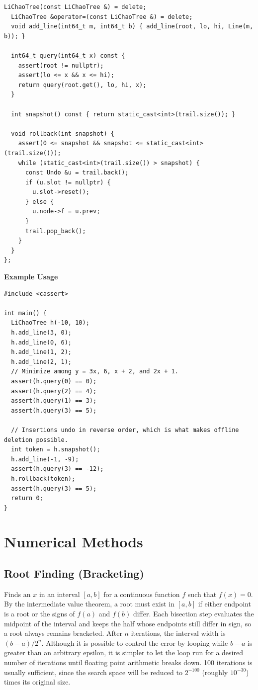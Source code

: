 \begin{lstlisting}[style=cpp]
  LiChaoTree(const LiChaoTree &) = delete;
  LiChaoTree &operator=(const LiChaoTree &) = delete;
  void add_line(int64_t m, int64_t b) { add_line(root, lo, hi, Line(m, b)); }

  int64_t query(int64_t x) const {
    assert(root != nullptr);
    assert(lo <= x && x <= hi);
    return query(root.get(), lo, hi, x);
  }

  int snapshot() const { return static_cast<int>(trail.size()); }

  void rollback(int snapshot) {
    assert(0 <= snapshot && snapshot <= static_cast<int>(trail.size()));
    while (static_cast<int>(trail.size()) > snapshot) {
      const Undo &u = trail.back();
      if (u.slot != nullptr) {
        u.slot->reset();
      } else {
        u.node->f = u.prev;
      }
      trail.pop_back();
    }
  }
};
\end{lstlisting}
\textbf{Example Usage}\par
\begin{lstlisting}[style=cpp]
#include <cassert>

int main() {
  LiChaoTree h(-10, 10);
  h.add_line(3, 0);
  h.add_line(0, 6);
  h.add_line(1, 2);
  h.add_line(2, 1);
  // Minimize among y = 3x, 6, x + 2, and 2x + 1.
  assert(h.query(0) == 0);
  assert(h.query(2) == 4);
  assert(h.query(1) == 3);
  assert(h.query(3) == 5);

  // Insertions undo in reverse order, which is what makes offline deletion possible.
  int token = h.snapshot();
  h.add_line(-1, -9);
  assert(h.query(3) == -12);
  h.rollback(token);
  assert(h.query(3) == 5);
  return 0;
}
\end{lstlisting}

\section{\texorpdfstring{Numerical Methods}{5.4 Numerical Methods}}
\setcounter{section}{4}
\setcounter{subsection}{0}
\subsection{Root Finding (Bracketing)}
\label{sec:5.4.1}
Finds an $x$ in an interval $[a, b]$ for a continuous function $f$ such that $f(x) = 0$. By the intermediate value theorem, a root must exist in $[a, b]$ if either endpoint is a root or the signs of $f(a)$ and $f(b)$ differ. Each bisection step evaluates the midpoint of the interval and keeps the half whose endpoints still differ in sign, so a root always remains bracketed. After $n$ iterations, the interval width is $(b - a) / 2^n$. Although it is possible to control the error by looping while $b - a$ is greater than an arbitrary epsilon, it is simpler to let the loop run for a desired number of iterations until floating point arithmetic breaks down. 100 iterations is usually sufficient, since the search space will be reduced to $2^{-100}$ (roughly $10^{-30}$) times its original size.

